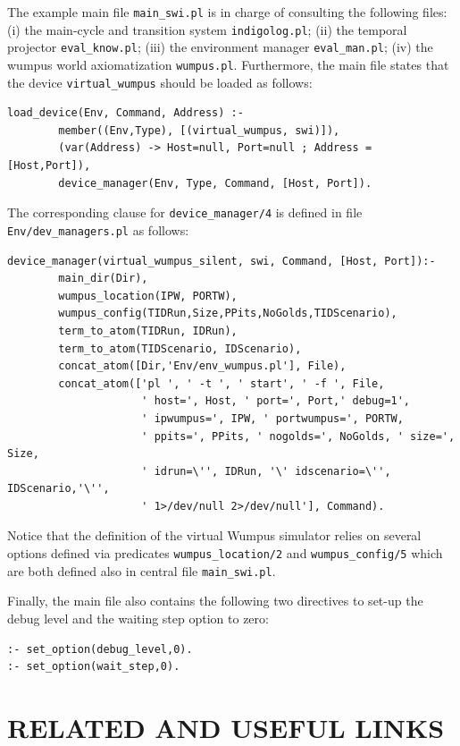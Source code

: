 \documentclass[11pt]{article}
\begin{document}
The example main file \texttt{main\_swi.pl} is in charge of consulting the
following files:  (i) the main-cycle and transition system
\texttt{indigolog.pl}; (ii) the temporal projector \texttt{eval\_know.pl};
(iii) the environment manager \texttt{eval\_man.pl}; (iv) the wumpus world
axiomatization \texttt{wumpus.pl}.
%
Furthermore, the main file states that the device \texttt{virtual\_wumpus}
should be loaded as follows:
%
\begin{verbatim}
load_device(Env, Command, Address) :- 
        member((Env,Type), [(virtual_wumpus, swi)]),
        (var(Address) -> Host=null, Port=null ; Address = [Host,Port]),
        device_manager(Env, Type, Command, [Host, Port]).
\end{verbatim}
%
The corresponding clause for \texttt{device\_manager/4} is defined in file
\texttt{Env/dev\_managers.pl} as follows:
\begin{verbatim}
device_manager(virtual_wumpus_silent, swi, Command, [Host, Port]):- 
        main_dir(Dir),
        wumpus_location(IPW, PORTW),
        wumpus_config(TIDRun,Size,PPits,NoGolds,TIDScenario),
        term_to_atom(TIDRun, IDRun),
        term_to_atom(TIDScenario, IDScenario),
        concat_atom([Dir,'Env/env_wumpus.pl'], File),
        concat_atom(['pl ', ' -t ', ' start', ' -f ', File,
                     ' host=', Host, ' port=', Port,' debug=1',
                     ' ipwumpus=', IPW, ' portwumpus=', PORTW, 
                     ' ppits=', PPits, ' nogolds=', NoGolds, ' size=', Size, 
                     ' idrun=\'', IDRun, '\' idscenario=\'', IDScenario,'\'',
                     ' 1>/dev/null 2>/dev/null'], Command).
\end{verbatim}

Notice that the definition of the virtual Wumpus simulator relies on several
options defined via predicates \texttt{wumpus\_location/2} and
\texttt{wumpus\_config/5} which are both defined also in central file
\texttt{main\_swi.pl}.

Finally, the main file also contains the following two directives to set-up the
debug level and the waiting step option to zero:
\begin{verbatim}
:- set_option(debug_level,0).
:- set_option(wait_step,0).
\end{verbatim}





\section{RELATED AND USEFUL LINKS} \label{sec:links}
\end{document}
